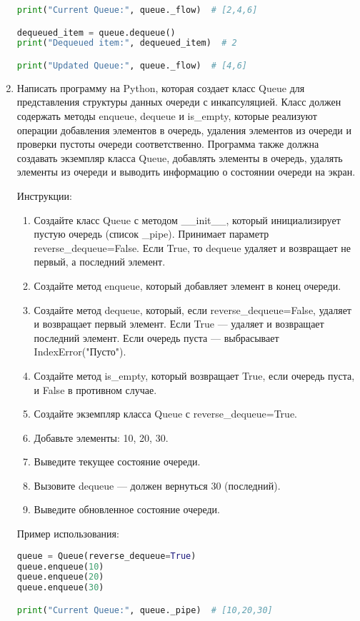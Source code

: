 \begin{enumerate}
\begin{lstlisting}[language=Python]
print("Current Queue:", queue._flow)  # [2,4,6]

dequeued_item = queue.dequeue()
print("Dequeued item:", dequeued_item)  # 2

print("Updated Queue:", queue._flow)  # [4,6]
\end{lstlisting}

\item Написать программу на Python, которая создает класс Queue для представления структуры данных очереди с инкапсуляцией. Класс должен содержать методы enqueue, dequeue и is\_empty, которые реализуют операции добавления элементов в очередь, удаления элементов из очереди и проверки пустоты очереди соответственно. Программа также должна создавать экземпляр класса Queue, добавлять элементы в очередь, удалять элементы из очереди и выводить информацию о состоянии очереди на экран.

Инструкции:
\begin{enumerate}
    \item Создайте класс Queue с методом \_\_init\_\_, который инициализирует пустую очередь (список \_pipe). Принимает параметр reverse\_dequeue=False. Если True, то dequeue удаляет и возвращает не первый, а последний элемент.
    \item Создайте метод enqueue, который добавляет элемент в конец очереди.
    \item Создайте метод dequeue, который, если reverse\_dequeue=False, удаляет и возвращает первый элемент. Если True — удаляет и возвращает последний элемент. Если очередь пуста — выбрасывает IndexError("Пусто").
    \item Создайте метод is\_empty, который возвращает True, если очередь пуста, и False в противном случае.
    \item Создайте экземпляр класса Queue с reverse\_dequeue=True.
    \item Добавьте элементы: 10, 20, 30.
    \item Выведите текущее состояние очереди.
    \item Вызовите dequeue — должен вернуться 30 (последний).
    \item Выведите обновленное состояние очереди.
\end{enumerate}

Пример использования:
\begin{lstlisting}[language=Python]
queue = Queue(reverse_dequeue=True)
queue.enqueue(10)
queue.enqueue(20)
queue.enqueue(30)

print("Current Queue:", queue._pipe)  # [10,20,30]


\end{lstlisting}
\end{enumerate}

